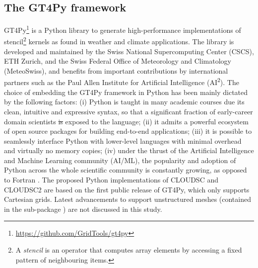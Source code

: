 \documentclass[gmd,manuscript,online]{copernicus}
\makeatletter
\theoremstyle{theorem}
\theoremstyle{definition}
\theoremstyle{remark}
\theoremstyle{proposition}
\providecommand{\DIFadd}[1]{{\protect\color{blue}\uwave{#1}}} %
\providecommand{\DIFdel}[1]{{\protect\color{red}\sout{#1}}} %
\providecommand{\DIFaddbegin}{} %
\providecommand{\DIFaddend}{} %
\providecommand{\DIFdelbegin}{} %
\providecommand{\DIFdelend}{} %
\newcommand{\DIFscaledelfig}{0.5}
\newlength{\DIFdelgraphicswidth} %
\newlength{\DIFdelgraphicsheight} %
\newcommand{\DIFaddincludegraphics}[2][]{{\color{blue}\fbox{\DIFOincludegraphics[#1]{#2}}}} %
\newcommand{\DIFdelincludegraphics}[2][]{%
\sbox{\DIFdelgraphicsbox}{\DIFOincludegraphics[#1]{#2}}%
\settoboxwidth{\DIFdelgraphicswidth}{\DIFdelgraphicsbox} %
\settoboxtotalheight{\DIFdelgraphicsheight}{\DIFdelgraphicsbox} %
\scalebox{\DIFscaledelfig}{%
\parbox[b]{\DIFdelgraphicswidth}{\usebox{\DIFdelgraphicsbox}\\[-\baselineskip] \rule{\DIFdelgraphicswidth}{0em}}\llap{\resizebox{\DIFdelgraphicswidth}{\DIFdelgraphicsheight}{%
\setlength{\unitlength}{\DIFdelgraphicswidth}%
\begin{picture}(1,1)%
\thicklines\linethickness{2pt} %
{\color[rgb]{1,0,0}\put(0,0){\framebox(1,1){}}}%
{\color[rgb]{1,0,0}\put(0,0){\line( 1,1){1}}}%
{\color[rgb]{1,0,0}\put(0,1){\line(1,-1){1}}}%
\end{picture}%
}\hspace*{3pt}}} %
} %
\DeclareRobustCommand{\DIFaddbegin}{\DIFOaddbegin \let\includegraphics\DIFaddincludegraphics} %
\DeclareRobustCommand{\DIFaddend}{\DIFOaddend \let\includegraphics\DIFOincludegraphics} %
\DeclareRobustCommand{\DIFdelbegin}{\DIFOdelbegin \let\includegraphics\DIFdelincludegraphics} %
\DeclareRobustCommand{\DIFdelend}{\DIFOaddend \let\includegraphics\DIFOincludegraphics} %
\let\sout@orig\sout %
\renewcommand{\sout}[1]{\ifmmode\text{\sout@orig{\ensuremath{#1}}}\else\sout@orig{#1}\fi} %
\makeatother
\begin{document}
	\subsection{The GT4Py framework}
	\label{section:gt4py}

	GT4Py\footnote{\url{https://github.com/GridTools/gt4py}} is a Python library to generate high-performance implementations of stencil\footnote{A \emph{stencil} is an operator that computes array elements by accessing a fixed pattern of neighbouring items.} kernels as found in weather and climate applications. The library is developed and maintained by the Swiss National Supercomputing Center (CSCS), ETH Zurich, and the Swiss Federal Office of Meteorology and Climatology (MeteoSwiss), and benefits from important contributions by international partners such as the Paul Allen Institute for Artificial Intelligence (AI\textsuperscript{2}). The choice of embedding the GT4Py framework in Python has been mainly dictated by the following factors: (i) Python is taught in many academic courses due its clean, intuitive and expressive syntax, so that a significant fraction of early-career domain scientists \DIFdelbegin \DIFdel{is }\DIFdelend \DIFaddbegin \DIFadd{are }\DIFaddend exposed to the language; (ii) it admits a powerful ecosystem of open source packages for building end-to-end applications; (iii) it is possible to seamlessly interface Python with lower-level languages with minimal overhead and virtually no memory copies; (iv) under the thrust of the Artificial Intelligence and Machine Learning community (AI/ML), the popularity and adoption of Python across the whole scientific community is constantly growing, as opposed to Fortran \citep{shipman23}. The proposed Python implementations of CLOUDSC and CLOUDSC2 are based on the first public release of GT4Py, which only supports Cartesian grids. Latest advancements to support unstructured meshes (contained in the sub-package ) are not discussed in this study.
\end{document}
